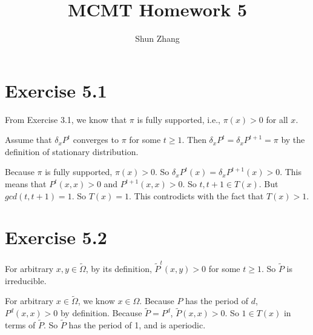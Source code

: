 \documentclass[10pt]{article}
\title{MCMT Homework 5}
\author{Shun Zhang}
\date{}
\begin{document}
\maketitle

\section*{Exercise 5.1}

From Exercise 3.1, we know that $\pi$ is fully supported, i.e., $\pi(x) > 0$
for all $x$.

Assume that $\delta_x P^t$ converges to $\pi$ for some $t \geq 1$. Then $\delta_x
P^t = \delta_x P^{t+1} = \pi$ by the definition of stationary distribution.

Because $\pi$ is fully supported, $\pi(x) > 0$. So $\delta_x P^t (x) = \delta_x
P^{t+1} (x) > 0$. This means that $P^t(x, x) > 0$ and $P^{t+1}(x, x) > 0$. So
$t, t+1 \in T(x)$. But $gcd(t, t+1) = 1$. So $T(x) = 1$. This controdicts with
the fact that $T(x) > 1$.

\section*{Exercise 5.2}

For arbitrary $x, y \in \tilde{\Omega}$, by its definition, $\tilde{P}^t(x, y) > 0$
for some $t \geq 1$. So $\tilde{P}$ is irreducible.

For arbitrary $x \in \tilde{\Omega}$, we know $x \in \Omega$. Because $P$ has
the period of $d$, $P^d(x, x) > 0$ by definition. Because $\tilde{P} = P^d$,
$\tilde{P}(x, x) > 0$. So $1 \in T(x)$ in terms of $\tilde{P}$. So $\tilde{P}$
has the period of 1, and is aperiodic.
\end{document}
